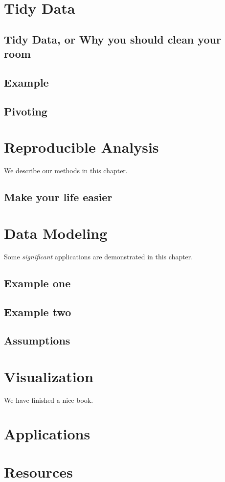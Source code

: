 \documentclass[]{book}
\begin{document}
\chapter{Tidy Data}\label{tidy-data}

\section{Tidy Data, or Why you should clean your
room}\label{tidy-data-or-why-you-should-clean-your-room}

\section{Example}\label{example}

\section{Pivoting}\label{pivoting}

\chapter{Reproducible Analysis}\label{reproducible-analysis}

We describe our methods in this chapter.

\section{Make your life easier}\label{make-your-life-easier}

\chapter{Data Modeling}\label{data-modeling}

Some \emph{significant} applications are demonstrated in this chapter.

\section{Example one}\label{example-one}

\section{Example two}\label{example-two}

\section{Assumptions}\label{assumptions}

\chapter{Visualization}\label{visualization}

We have finished a nice book.

\chapter{Applications}\label{applications}

\chapter{Resources}\label{resources}


\end{document}
